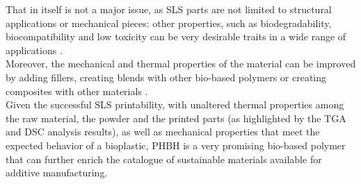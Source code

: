 \documentclass{article}
\begin{document}
        That in itself is not a major issue, as SLS parts are not limited to structural applications or mechanical pieces:
        other properties, such as biodegradability, biocompatibility and low toxicity can be very desirable traits in a wide range of 
        applications \autocites{SLS_3dprinting_biomedical_polymers, Kovalcik_PHA_Review}. \\ 

        Moreover, the mechanical and thermal properties of the material can be improved by adding fillers, creating blends with other 
        bio-based polymers or creating composites with other materials \autocites{Recent_progress_polymers_AM,Eraslan_PHBH_review,PHBH_Crystallinity}. \\ 

        Given the successful SLS printability, with unaltered thermal properties among the raw material, the powder and the 
        printed parts (as highlighted by the TGA and DSC analysis results), as well as 
        mechanical properties that meet the expected behavior of a bioplastic, PHBH is a very promising bio-based polymer 
        that can further enrich the catalogue of sustainable materials available for additive manufacturing. \\ 
\end{document}
